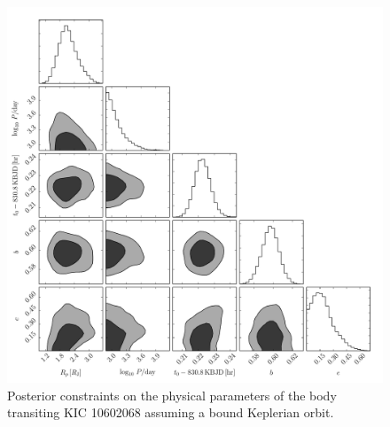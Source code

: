 \begin{figure}[p]
\begin{center}
\includegraphics[width=\textwidth]{figures/peerless/corner.pdf}
\end{center}
\caption{%
Posterior constraints on the physical parameters of the body transiting KIC
10602068 assuming a bound Keplerian orbit.
}
\end{figure}



